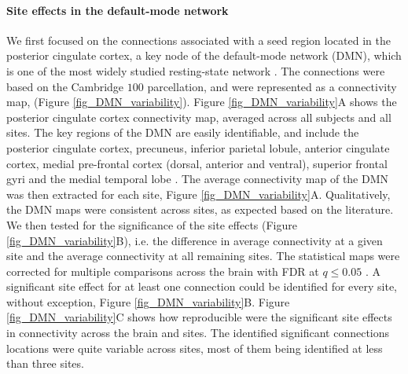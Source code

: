 \documentclass[authoryear]{elsarticle}
\begin{document}
\paragraph{Site effects in the default-mode network} We first focused on the
connections associated with a seed region located in the posterior cingulate cortex, a key
node of the default-mode network (DMN), which is one of the most widely studied
resting-state network \citep{Greicius2004}. The connections were based on the
Cambridge $100$ parcellation, and were represented as a connectivity map, (Figure
\ref{fig_DMN_variability}). Figure \ref{fig_DMN_variability}A shows the posterior cingulate cortex
connectivity map, averaged across all subjects and all sites. The key regions of
the DMN are easily identifiable, and include the posterior cingulate cortex, precuneus, inferior
parietal lobule, anterior cingulate cortex, medial pre-frontal cortex (dorsal,
anterior and ventral), superior frontal gyri and the medial temporal lobe
\citep{Damoiseaux2006,Dansereau2014,Yan2013a}. The average
connectivity map of the DMN was then extracted for each site, Figure
\ref{fig_DMN_variability}A. Qualitatively, the DMN maps were consistent across
sites, as expected based on the literature. We then tested for the significance
of the site effects (Figure \ref{fig_DMN_variability}B), i.e. the difference in average connectivity at a given site
and the average connectivity at all remaining sites. The statistical maps were
corrected for multiple comparisons across the brain with FDR at $q\leq 0.05$
\citep{Benjamini1995}. A significant site effect for at least one connection could be
identified for every site, without exception, Figure
\ref{fig_DMN_variability}B. Figure \ref{fig_DMN_variability}C shows how
reproducible were the significant site effects in connectivity across the brain and
sites. The identified significant connections locations were quite variable across sites, most of them being
identified at less than three sites.
\end{document}

